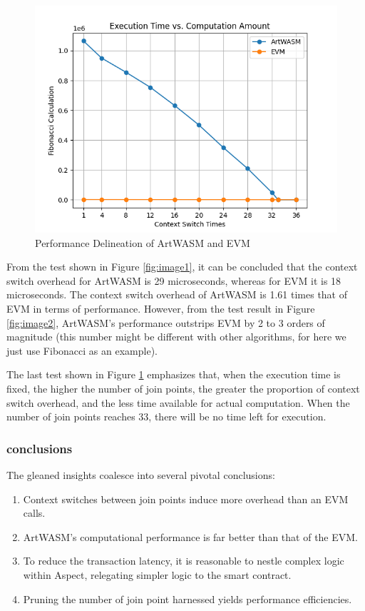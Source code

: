 \begin{figure}[htp]
\begin{minipage}{0.3\textwidth}
    \centering
    \includegraphics[width=1\linewidth]{sections/tx-latency-na-vs-jpc.png}
    \caption{Performance Delineation of ArtWASM and EVM}
    \label{fig:image3}
  \end{minipage}
\end{figure}

From the test shown in Figure \ref{fig:image1}, it can be concluded that the context switch overhead for ArtWASM is 29 microseconds, whereas for EVM it is 18 microseconds. The context switch overhead of ArtWASM is 1.61 times that of EVM in terms of performance. However, from the test result in Figure \ref{fig:image2}, ArtWASM's performance outstrips EVM by 2 to 3 orders of magnitude (this number might be different with other algorithms, for here we just use Fibonacci as an example).

The last test shown in Figure \ref{fig:image3} emphasizes that, when the execution time is fixed, the higher the number of join points, the greater the proportion of context switch overhead, and the less time available for actual computation. When the number of join points reaches 33, there will be no time left for execution.

\subsubsection{conclusions}
The gleaned insights coalesce into several pivotal conclusions:

\begin{enumerate}
  \item Context switches between join points induce more overhead than an EVM calls.
  \item ArtWASM's computational performance is far better than that of the EVM.
  \item To reduce the transaction latency, it is reasonable to nestle complex logic within Aspect, relegating simpler logic to the smart contract.
  \item Pruning the number of join point harnessed yields performance efficiencies.
\end{enumerate}


